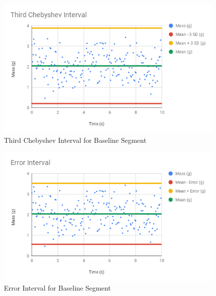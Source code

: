 \begin{figure} \label{figure.baseline.chebyshev.3}
    \begin{center}
        \includegraphics[scale=0.77]{images/00-intro/baseline-chebyshev-3.png}
    \end{center}
    \caption{Third Chebyshev Interval for Baseline Segment}
\end{figure}
\begin{figure} \label{figure.baseline.interval}
    \begin{center}
        \includegraphics[scale=0.77]{images/00-intro/baseline-error-interval.png}
    \end{center}
    \caption{Error Interval for Baseline Segment}
\end{figure}
